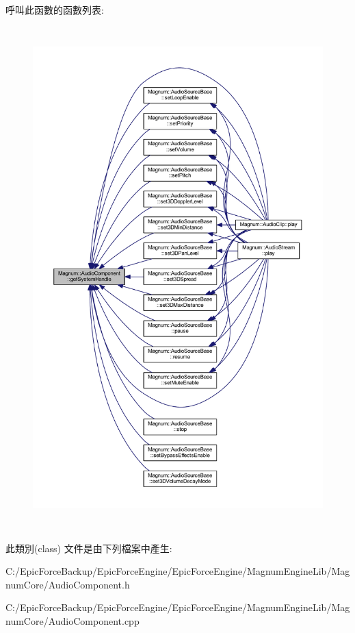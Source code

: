 呼叫此函數的函數列表\+:\nopagebreak
\begin{figure}[H]
\begin{center}
\leavevmode
\includegraphics[height=550pt]{class_magnum_1_1_audio_component_a66fcbd1e83043254ed81220d82c0c565_icgraph}
\end{center}
\end{figure}




此類別(class) 文件是由下列檔案中產生\+:\begin{DoxyCompactItemize}
\item 
C\+:/\+Epic\+Force\+Backup/\+Epic\+Force\+Engine/\+Epic\+Force\+Engine/\+Magnum\+Engine\+Lib/\+Magnum\+Core/Audio\+Component.\+h\item 
C\+:/\+Epic\+Force\+Backup/\+Epic\+Force\+Engine/\+Epic\+Force\+Engine/\+Magnum\+Engine\+Lib/\+Magnum\+Core/Audio\+Component.\+cpp\end{DoxyCompactItemize}
